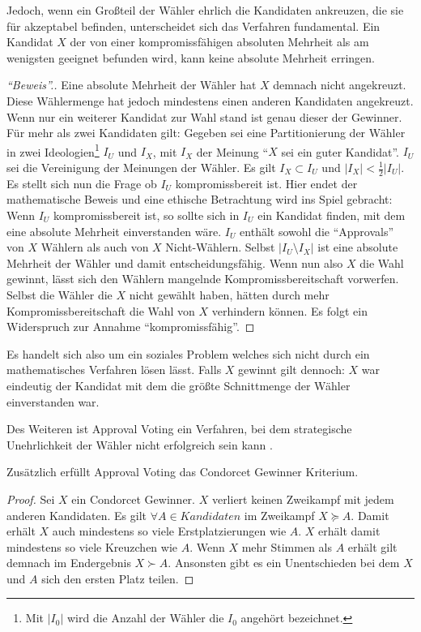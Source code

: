 \documentclass[BCOR5mm,DIV12,a4paper,10pt]{scrartcl}
\begin{document}
Jedoch, wenn ein Großteil der Wähler ehrlich die Kandidaten ankreuzen, die sie für akzeptabel befinden, unterscheidet sich das Verfahren fundamental. Ein Kandidat $X$ der von einer kompromissfähigen absoluten Mehrheit als am wenigsten geeignet befunden wird, kann keine absolute Mehrheit erringen.
\begin{proof}[``Beweis''.]
Eine absolute Mehrheit der Wähler hat $X$ demnach nicht angekreuzt. Diese Wählermenge hat jedoch mindestens einen anderen Kandidaten angekreuzt. Wenn nur ein weiterer Kandidat zur Wahl stand ist genau dieser der Gewinner. Für mehr als zwei Kandidaten gilt: Gegeben sei eine Partitionierung der Wähler in zwei Ideologien\footnote{Mit $|I_0|$ wird die Anzahl der Wähler die $I_0$ angehört bezeichnet.} $I_U$ und $I_X$, mit $I_X$ der Meinung ``$X$ sei ein guter Kandidat''. $I_U$ sei die Vereinigung der Meinungen der Wähler. Es gilt $I_X \subset I_U$ und $|I_X| < \frac{1}{2} |I_U|$. Es stellt sich nun die Frage ob $I_U$ kompromissbereit ist. Hier endet der mathematische Beweis und eine ethische Betrachtung wird ins Spiel gebracht: Wenn $I_U$ kompromissbereit ist, so sollte sich in $I_U$ ein Kandidat finden, mit dem eine absolute Mehrheit einverstanden wäre. $I_U$ enthält sowohl die ``Approvals'' von $X$ Wählern als auch von $X$ Nicht-Wählern. Selbst $|I_U \setminus I_X|$ ist eine absolute Mehrheit der Wähler und damit entscheidungsfähig. Wenn nun also $X$ die Wahl gewinnt, lässt sich den Wählern mangelnde Kompromissbereitschaft vorwerfen. Selbst die Wähler die $X$ nicht gewählt haben, hätten durch mehr Kompromissbereitschaft die Wahl von $X$ verhindern können. Es folgt ein Widerspruch zur Annahme ``kompromissfähig''.
\end{proof}

Es handelt sich also um ein soziales Problem welches sich nicht durch ein mathematisches Verfahren lösen lässt. Falls $X$ gewinnt gilt dennoch: $X$ war eindeutig der Kandidat mit dem die größte Schnittmenge der Wähler einverstanden war.
\newline

Des Weiteren ist Approval Voting ein Verfahren, bei dem strategische Unehrlichkeit der Wähler nicht erfolgreich sein kann \cite{spektrum}.

Zusätzlich erfüllt Approval Voting das Condorcet Gewinner Kriterium.
\begin{proof}
Sei $X$ ein Condorcet Gewinner. $X$ verliert keinen Zweikampf mit jedem anderen Kandidaten. Es gilt $ \forall A \in Kandidaten$ im Zweikampf $X \succeq A$. Damit erhält $X$ auch mindestens so viele Erstplatzierungen wie $A$. $X$ erhält damit mindestens so viele Kreuzchen wie $A$. Wenn $X$ mehr Stimmen als $A$ erhält gilt demnach im Endergebnis $ X \succ A$. Ansonsten gibt es ein Unentschieden bei dem $X$ und $A$ sich den ersten Platz teilen.
\end{proof}
\end{document}
